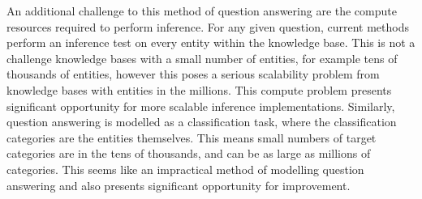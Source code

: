 An additional challenge to this method of question answering are the compute resources required to perform inference. For any given question, current methods perform an inference test on every entity within the knowledge base. This is not a challenge knowledge bases with a small number of entities, for example tens of thousands of entities, however this poses a serious scalability problem from knowledge bases with entities in the millions. This compute problem presents significant opportunity for more scalable inference implementations. Similarly, question answering is modelled as a classification task, where the classification categories are the entities themselves. This means small numbers of target categories are in the tens of thousands, and can be as large as millions of categories. This seems like an impractical method of modelling question answering and also presents significant opportunity for improvement. 


